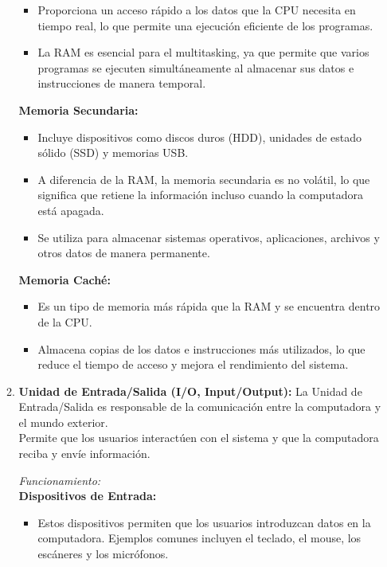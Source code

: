 \documentclass[12pt,letterpaper]{article}
\begin{document}
\begin{enumerate}
\begin{enumerate}[label=\arabic*)]
\begin{itemize}
      \item Proporciona un acceso rápido a los datos que la CPU necesita en tiempo real, lo que permite una ejecución eficiente de los programas.
        
      \item La RAM es esencial para el multitasking, ya que permite que varios programas se ejecuten simultáneamente al almacenar sus datos e instrucciones de manera temporal.
      \end{itemize}
      
      \textbf{Memoria Secundaria:}
      \begin{itemize}
      \item Incluye dispositivos como discos duros (HDD), unidades de estado sólido (SSD) y memorias USB.
        
      \item A diferencia de la RAM, la memoria secundaria es no volátil, lo que significa que retiene la información incluso cuando la computadora está apagada.
        
      \item Se utiliza para almacenar sistemas operativos, aplicaciones, archivos y otros datos de manera permanente.
      \end{itemize}
      
      \textbf{Memoria Caché:}
      \begin{itemize}
      \item Es un tipo de memoria más rápida que la RAM y se encuentra dentro de la CPU.
        
      \item Almacena copias de los datos e instrucciones más utilizados, lo que reduce el tiempo de acceso y mejora el rendimiento del sistema.
      \end{itemize}
      
    \item \textbf{Unidad de Entrada/Salida (I/O, Input/Output):}
      La Unidad de Entrada/Salida es responsable de la comunicación entre la computadora y el mundo exterior.\\
      Permite que los usuarios interactúen con el sistema y que la computadora reciba y envíe información.

      \textit{Funcionamiento:}\\
      \textbf{Dispositivos de Entrada:}
      \begin{itemize}
      \item Estos dispositivos permiten que los usuarios introduzcan datos en la computadora.
        Ejemplos comunes incluyen el teclado, el mouse, los escáneres y los micrófonos.
        

\end{itemize}
\end{enumerate}
\end{enumerate}
\end{document}
